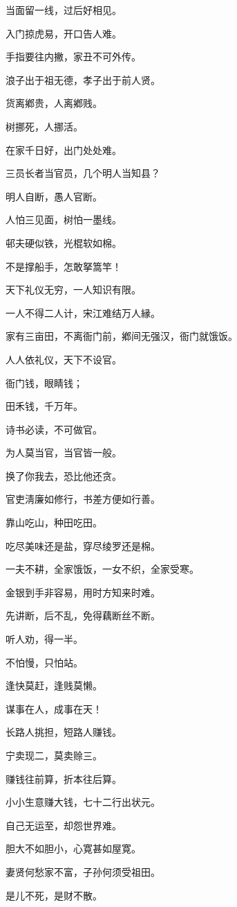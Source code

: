 \documentclass[12pt,oneside]{book}
\begin{document}
当面留一线，过后好相见。

入门掠虎易，开口告人难。

手指要往内撇，家丑不可外传。

浪子出于祖无德，孝子出于前人贤。

货离鄕贵，人离鄕贱。

树挪死，人挪活。

在家千日好，出门处处难。

三员长者当官员，几个明人当知县？

明人自断，愚人官断。

人怕三见面，树怕一墨线。

邨夫硬似铁，光棍软如棉。

不是撑船手，怎敢拏篙竿！

天下礼仪无穷，一人知识有限。

一人不得二人计，宋江难结万人縁。

家有三亩田，不离衙门前，鄕间无强汉，衙门就饿饭。

人人依礼仪，天下不设官。

衙门钱，眼睛钱；

田禾钱，千万年。

诗书必读，不可做官。

为人莫当官，当官皆一般。

换了你我去，恐比他还贪。

官吏淸廉如修行，书差方便如行善。

靠山吃山，种田吃田。

吃尽美味还是盐，穿尽绫罗还是棉。

一夫不耕，全家饿饭，一女不织，全家受寒。

金银到手非容易，用时方知来时难。

先讲断，后不乱，免得藕断丝不断。

听人劝，得一半。

不怕慢，只怕站。

逢快莫赶，逢贱莫懒。

谋事在人，成事在天！

长路人挑担，短路人赚钱。

宁卖现二，莫卖赊三。

赚钱往前算，折本往后算。

小小生意赚大钱，七十二行出状元。

自己无运至，却怨世界难。

胆大不如胆小，心寛甚如屋寛。

妻贤何愁家不富，子孙何须受祖田。

是儿不死，是财不散。
\end{document}
